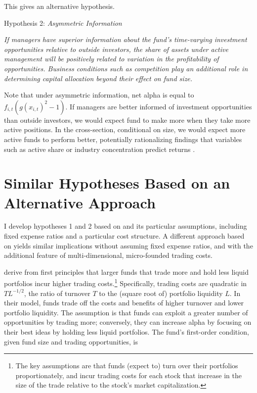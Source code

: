 \documentclass[openany]{book}
\let\rmarkdownfootnote\footnote%
\def\footnote{\protect\rmarkdownfootnote}
\theoremstyle{definition}
\theoremstyle{definition}
\theoremstyle{definition}
\theoremstyle{remark}
\begin{document}
This gives an alternative hypothesis.

Hypothesis 2: \emph{Asymmetric Information}

\emph{If managers have superior information about the fund's
time-varying investment opportunities relative to outside investors, the
share of assets under active management will be positively related to
variation in the profitability of opportunities. Business conditions
such as competition play an additional role in determining capital
allocation beyond their effect on fund size.}

Note that under asymmetric information, net alpha is equal to
\(f_{i,t}(g(x_{i,t})^2-1)\). If managers are better informed of
investment opportunities than outside investors, we would expect fund to
make more when they take more active positions. In the cross-section,
conditional on size, we would expect more active funds to perform
better, potentially rationalizing findings that variables such as active
share or industry concentration predict returns \citep{cp09, ksz05}.

\section{Similar Hypotheses Based on an Alternative
Approach}\label{similar-hypotheses-based-on-an-alternative-approach}

I develop hypotheses 1 and 2 based on \citet{bg04} and its particular
assumptions, including fixed expense ratios and a particular cost
structure. A different approach based on \citet{pst17L} yields similar
implications without assuming fixed expense ratios, and with the
additional feature of multi-dimensional, micro-founded trading costs.

\citet{pst17L} derive from first principles that larger funds that trade
more and hold less liquid portfolios incur higher trading
costs.\footnote{The key assumptions are that funds (expect to) turn over
  their portfolios proportionately, and incur trading costs for each
  stock that increase in the size of the trade relative to the stock's
  market capitalization.} Specifically, trading costs are quadratic in
\(TL^{-1/2}\), the ratio of turnover \(T\) to the (square root of)
portfolio liquidity \(L\). In their model, funds trade off the costs and
benefits of higher turnover and lower portfolio liquidity. The
assumption is that funds can exploit a greater number of opportunities
by trading more; conversely, they can increase alpha by focusing on
their best ideas by holding less liquid portfolios. The fund's
first-order condition, given fund size and trading opportunities, is
\end{document}
